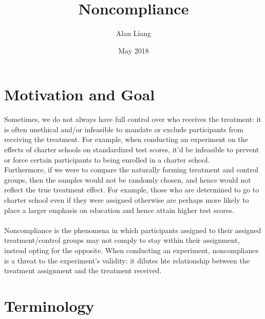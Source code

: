 \documentclass{article}
\title{Noncompliance}
\author{Alan Liang}
\date{May 2018}
\begin{document}
\maketitle

\section{Motivation and Goal}

Sometimes, we do not always have full control over who receives the treatment: it is often unethical and/or infeasible to mandate or exclude participants from receiving the treatment.
For example, when conducting an experiment on the effects of charter schools on standardized test scores, it'd be infeasible to prevent or force certain participants to being enrolled in a charter school. 
\\
Furthermore, if we were to compare the naturally forming treatment and control groups, then the samples would not be randomly chosen, and hence would not reflect the true treatment effect. 
For example, those who are determined to go to charter school even if they were assigned otherwise are perhaps more likely to place a larger emphasis on education and hence attain higher test scores.
\\
\\
Noncompliance is the phenomena in which participants assigned to their assigned treatment/control groups may not comply to stay within their assignment, instead opting for the opposite. 
When conducting an experiment, noncompliance is a threat to the experiment's validity: it dilutes hte relationship between the treatment assignment and the treatment received.

\section{Terminology} 
\end{document}
